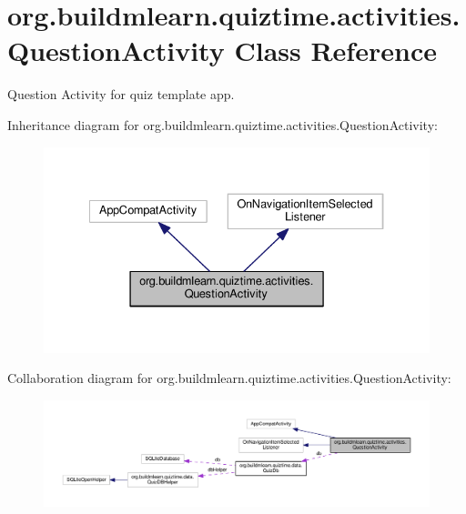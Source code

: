 \hypertarget{classorg_1_1buildmlearn_1_1quiztime_1_1activities_1_1QuestionActivity}{}\section{org.\+buildmlearn.\+quiztime.\+activities.\+Question\+Activity Class Reference}
\label{classorg_1_1buildmlearn_1_1quiztime_1_1activities_1_1QuestionActivity}


Question Activity for quiz template app.  




Inheritance diagram for org.\+buildmlearn.\+quiztime.\+activities.\+Question\+Activity\+:
\nopagebreak
\begin{figure}[H]
\begin{center}
\leavevmode
\includegraphics[width=334pt]{classorg_1_1buildmlearn_1_1quiztime_1_1activities_1_1QuestionActivity__inherit__graph}
\end{center}
\end{figure}


Collaboration diagram for org.\+buildmlearn.\+quiztime.\+activities.\+Question\+Activity\+:
\nopagebreak
\begin{figure}[H]
\begin{center}
\leavevmode
\includegraphics[width=350pt]{classorg_1_1buildmlearn_1_1quiztime_1_1activities_1_1QuestionActivity__coll__graph}
\end{center}
\end{figure}
